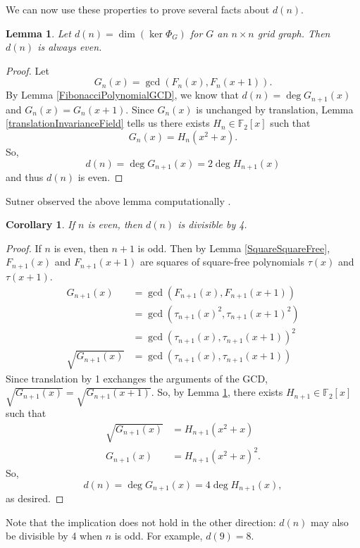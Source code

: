 \documentclass[a4paper]{article}
\newtheorem{lemma}[theorem]{Lemma}
\newtheorem{corollary}[theorem]{Corollary}
\newcommand{\F}{\mathbb{F}}
\renewcommand{\dim}[1]{\operatorname{dim}\!\left( #1 \right)}
\begin{document}
	We can now use these properties to prove several facts about $d(n)$.
	\begin{lemma}\label{DEven}
		Let $d(n) = \dim{\ker{\Phi_G}}$ for $G$ an $n \times n$ grid graph.
		Then $d(n)$ is always even.
	\end{lemma}
	\begin{proof}
		Let
		\begin{equation*}
			G_n(x) = \gcd{\left(F_{n}(x),F_{n}(x+1)\right)}.
		\end{equation*}
		By Lemma \ref{FibonacciPolynomialGCD}, we know that $d(n) = \deg{G_{n+1}(x)}$ and $G_n(x) = G_n(x+1)$.
		Since $G_n(x)$ is unchanged by translation, Lemma \ref{translationInvarianceField} tells us there exists $H_n \in \F_2[x]$ such that
		\begin{equation*}
			G_n(x) = H_n(x^2 + x).
		\end{equation*}
		So,
		\begin{equation*}
			d(n) = \deg{G_{n+1}(x)} = 2\deg{H_{n+1}(x)}
		\end{equation*}
		and thus $d(n)$ is even.
	\end{proof}
	Sutner observed the above lemma computationally \cite{Sutner1989}.

	\begin{corollary}\label{NEvenDDivisible4}
		If $n$ is even, then $d(n)$ is divisible by 4.
	\end{corollary}
	\begin{proof}
		If $n$ is even, then $n+1$ is odd.
		Then by Lemma \ref{SquareSquareFree}, $F_{n+1}(x)$ and $F_{n+1}(x+1)$ are squares of square-free polynomials $\tau(x)$ and $\tau(x+1)$.
		\begin{align*}
			G_{n+1}(x) &= \gcd{\left(F_{n+1}(x),F_{n+1}(x+1)\right)} \\
			&= \gcd{\left(\tau_{n+1}(x)^2, \tau_{n+1}(x+1)^2\right)} \\
			&= \gcd{\left(\tau_{n+1}(x), \tau_{n+1}(x+1)\right)}^2 \\
			\sqrt{G_{n+1}(x)} &= \gcd{\left(\tau_{n+1}(x), \tau_{n+1}(x+1)\right)}
		\end{align*}
		Since translation by 1 exchanges the arguments of the GCD, $\sqrt{G_{n+1}(x)} = \sqrt{G_{n+1}(x+1)}$.
		So, by Lemma \ref{DEven}, there exists $H_{n+1} \in \F_2[x]$ such that
		\begin{align*}
			\sqrt{G_{n+1}(x)} &= H_{n+1}(x^2+x) \\
			G_{n+1}(x) &= H_{n+1}(x^2+x)^2.
		\end{align*}
		So,
		\begin{equation*}
			d(n) = \deg G_{n+1}(x) = 4\deg{H_{n+1}(x)},
		\end{equation*}
		as desired.
	\end{proof}
	Note that the implication does not hold in the other direction: $d(n)$ may also be divisible by 4 when $n$ is odd.
	For example, $d(9) = 8$.
\end{document}

